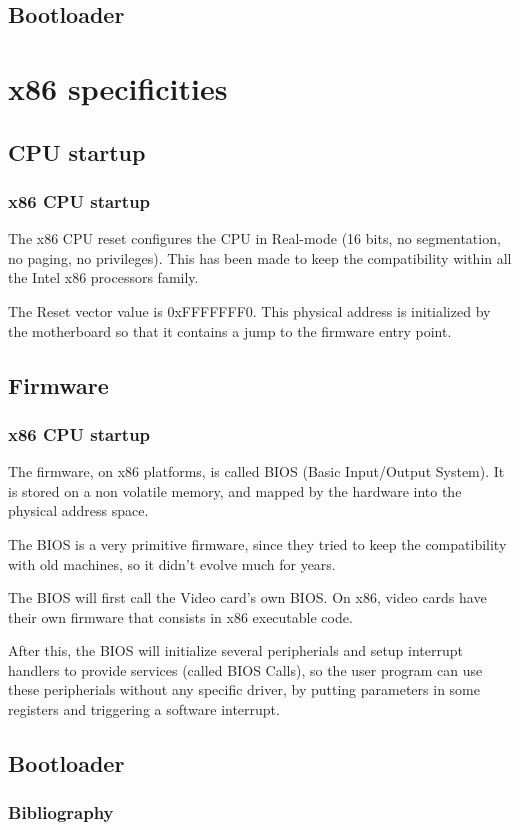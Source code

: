 \subsection{Bootloader}

\section{x86 specificities}
\subsection{CPU startup}

\begin{frame}
  \frametitle{x86 CPU startup}

  The x86 CPU reset configures the CPU in Real-mode (16 bits, no segmentation, no paging, no privileges). This has been made to keep the compatibility within all the Intel x86 processors family.

  \- 

  The Reset vector value is 0xFFFFFFF0. This physical address is initialized by the motherboard so that it contains a jump to the firmware entry point.

\end{frame}

\subsection{Firmware}

\begin{frame}
  \frametitle{x86 CPU startup}

  The firmware, on x86 platforms, is called BIOS (Basic Input/Output System). It is stored on a non volatile memory, and mapped by the hardware into the physical address space.

  \-

  The BIOS is a very primitive firmware, since they tried to keep the compatibility with old machines, so it didn't evolve much for years.

  \-

  The BIOS will first call the Video card's own BIOS. On x86, video cards have their own firmware that consists in x86 executable code.

  \-

  After this, the BIOS will initialize several peripherials and setup interrupt handlers to provide services (called BIOS Calls), so the user program can use these peripherials without any specific driver, by putting parameters in some registers and triggering a software interrupt.

\end{frame}

\subsection{Bootloader}

%
%

\begin{frame}[allowframebreaks]
  \frametitle{Bibliography}

  
  
\end{frame}


